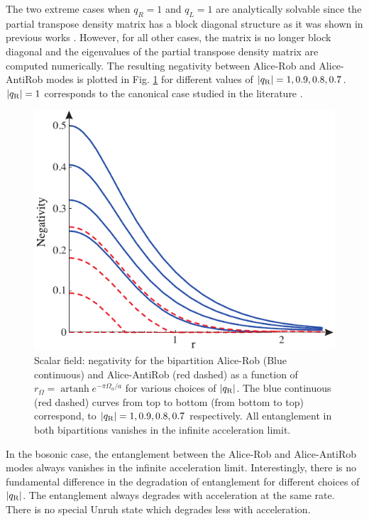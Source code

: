 The two extreme cases when $q_R=1$ and $q_L=1$ are analytically solvable since the partial transpose density matrix has a block diagonal structure as it was shown in previous works \cite{Alicefalls}. However, for all other cases,  the matrix is no longer block diagonal and the eigenvalues of the partial transpose density matrix are computed numerically. The resulting negativity between Alice-Rob and Alice-AntiRob modes is plotted in Fig. \ref{figbosons} for different values of $|q_\text{\text{R}}|=1,0.9,0.8,0.7$.  $|q_\text{\text{R}}|=1$ corresponds to the canonical case studied in the literature \cite{Alicefalls}. 

\begin{figure}[h]
\begin{center}
\includegraphics[width=.80\textwidth]{bosons}
\end{center}
\caption{Scalar field: negativity for the bipartition Alice-Rob (Blue continuous) and Alice-AntiRob (red dashed) as a function of $r_{\Omega}=\operatorname{artanh}{e^{-\pi\Omega_a/a}}$ for various choices of $|q_\text{\text{R}}|$. The blue continuous (red dashed) curves from top to bottom (from bottom to top) correspond, to $|q_\text{\text{R}}|=1,0.9,0.8,0.7$  respectively. All entanglement in both bipartitions vanishes in the infinite acceleration limit.}
\label{figbosons}
\end{figure}
In the bosonic case, the entanglement between the Alice-Rob and Alice-AntiRob modes always vanishes in the infinite acceleration limit. Interestingly,  there is no fundamental difference in the degradation of entanglement  for different choices of $|q_\text{\text{R}}|$. The entanglement always degrades with acceleration at the same rate. There is no special Unruh state which degrades less with acceleration.  


